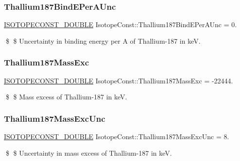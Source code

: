 \subsubsection{\texorpdfstring{Thallium187\+Bind\+E\+Per\+A\+Unc}{Thallium187BindEPerAUnc}}
{\footnotesize\ttfamily \mbox{\hyperlink{group___isotope_const-_macros_ga8f45a7272ce02c0b4c65c44636ed719a}{I\+S\+O\+T\+O\+P\+E\+C\+O\+N\+S\+T\+\_\+\+D\+O\+U\+B\+LE}} Isotope\+Const\+::\+Thallium187\+Bind\+E\+Per\+A\+Unc = 0.}

\$ \$ Uncertainty in binding energy per A of Thallium-\/187 in keV. \mbox{\label{group___isotope_const-_thallium-_tl187_gaf4afad8d5b0581b1e4497d282fabcb39}} 
\subsubsection{\texorpdfstring{Thallium187\+Mass\+Exc}{Thallium187MassExc}}
{\footnotesize\ttfamily \mbox{\hyperlink{group___isotope_const-_macros_ga8f45a7272ce02c0b4c65c44636ed719a}{I\+S\+O\+T\+O\+P\+E\+C\+O\+N\+S\+T\+\_\+\+D\+O\+U\+B\+LE}} Isotope\+Const\+::\+Thallium187\+Mass\+Exc = -\/22444.}

\$ \$ Mass excess of Thallium-\/187 in keV. \mbox{\label{group___isotope_const-_thallium-_tl187_ga2ecd754876c725dee0c7f9e3f5e7aed1}} 
\subsubsection{\texorpdfstring{Thallium187\+Mass\+Exc\+Unc}{Thallium187MassExcUnc}}
{\footnotesize\ttfamily \mbox{\hyperlink{group___isotope_const-_macros_ga8f45a7272ce02c0b4c65c44636ed719a}{I\+S\+O\+T\+O\+P\+E\+C\+O\+N\+S\+T\+\_\+\+D\+O\+U\+B\+LE}} Isotope\+Const\+::\+Thallium187\+Mass\+Exc\+Unc = 8.}

\$ \$ Uncertainty in mass excess of Thallium-\/187 in keV. \mbox{\label{group___isotope_const-_thallium-_tl187_ga3200fe447707795b828a452d4189a2a7}} 
